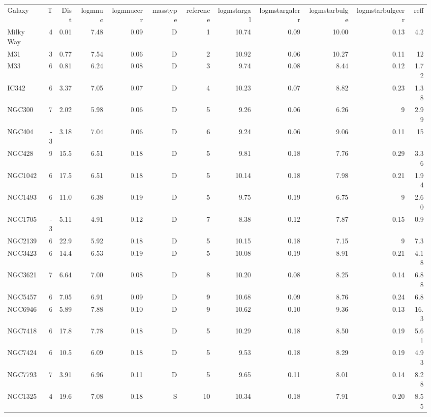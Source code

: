 \begin{tabular}{lrrrrrrrrrrr}
Galaxy & T & Dist & logmnuc & logmnucerr & masstype & reference & logmstargal & logmstargalerr & logmstarbulge & logmstarbulgeerr & reff \\
Milky Way  &  4 & 0.01  & 7.48 & 0.09  & D  & 1  & 10.74 & 0.09  & 10.00 & 0.13 & 4.2 \\
M31  &  3 & 0.77  & 7.54 & 0.06  & D  & 2  & 10.92 & 0.06  & 10.27 & 0.11 & 12  \\
M33  &  6 & 0.81  & 6.24 & 0.08  & D  & 3  & 9.74 & 0.08  & 8.44 & 0.12 & 1.72 \\
IC342  &  6 & 3.37  & 7.05 & 0.07  & D  & 4  & 10.23 & 0.07  & 8.82 & 0.23 & 1.38  \\
NGC300  &  7 & 2.02  & 5.98 & 0.06  & D  & 5  & 9.26 & 0.06  &   6.26 & 9 & 2.99 \\
NGC404  &  -3 & 3.18  & 7.04 & 0.06  & D  & 6  & 9.24 & 0.06  & 9.06 & 0.11 & 15 \\
NGC428  &  9 & 15.5  & 6.51 & 0.18  & D  & 5  & 9.81 & 0.18  & 7.76 & 0.29 & 3.36  \\
NGC1042  &  6 & 17.5  & 6.51 & 0.18  & D  & 5  & 10.14 & 0.18  & 7.98 & 0.21 & 1.94 \\
NGC1493  &  6 & 11.0  & 6.38 & 0.19  & D  & 5  & 9.75 & 0.19  &   6.75 & 9 & 2.60 \\
NGC1705  &  -3 & 5.11  & 4.91 & 0.12  & D  & 7  & 8.38 & 0.12  & 7.87 & 0.15 & 0.9 \\
NGC2139  &  6 & 22.9  & 5.92 & 0.18  & D  & 5  & 10.15 & 0.18  &   7.15 & 9 & 7.3 \\
NGC3423  &  6 & 14.4  & 6.53 & 0.19  & D  & 5  & 10.08 & 0.19  & 8.91 & 0.21 & 4.18 \\
NGC3621  &  7 & 6.64  & 7.00 & 0.08  & D  & 8  & 10.20 & 0.08  & 8.25 & 0.14 & 6.88 \\
NGC5457  &  6 & 7.05  & 6.91 & 0.09  & D  & 9  & 10.68 & 0.09  & 8.76 & 0.24 & 6.8  \\
NGC6946  &  6 & 5.89  & 7.88 & 0.10  & D  & 9  & 10.62 & 0.10  & 9.36 & 0.13 & 16.3 \\
NGC7418  &  6 & 17.8  & 7.78 & 0.18  & D  & 5  & 10.29 & 0.18  & 8.50 & 0.19 & 5.61 \\
NGC7424  &  6 & 10.5  & 6.09 & 0.18  & D  & 5  & 9.53 & 0.18  & 8.29 & 0.19 & 4.93 \\
NGC7793  &  7 & 3.91  & 6.96 & 0.11  & D  & 5  & 9.65 & 0.11  & 8.01 & 0.14 & 8.28 \\
NGC1325  &  4 & 19.6  & 7.08 & 0.18  & S  & 10  & 10.34 & 0.18  & 7.91 & 0.20 & 8.55 \\

\end{tabular}

